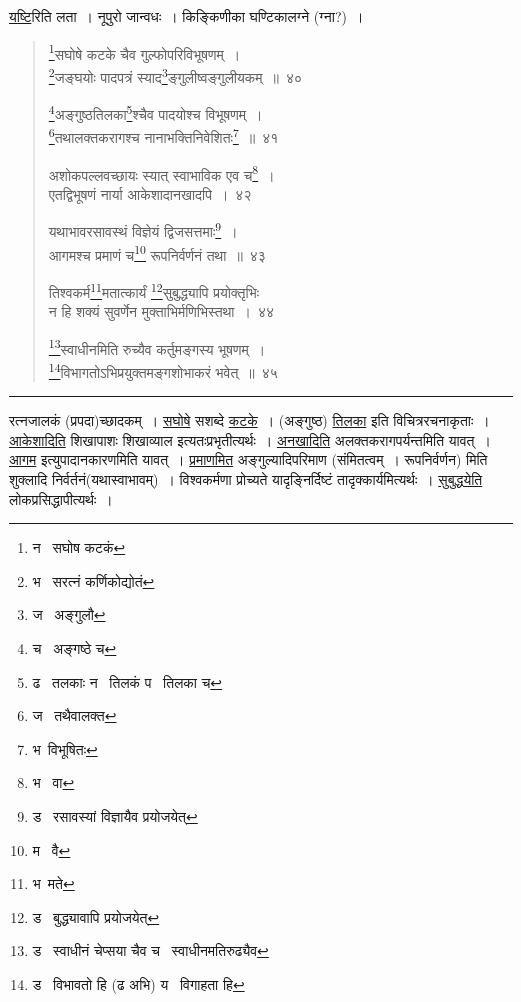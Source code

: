 \documentclass[11pt, openany]{book}
\begin{document}
\underline{यष्टि}रिति लता~। नूपुरो जान्वधः~। किङ्किणीका घण्टिकालग्ने (ग्ना?)~। 

\newpage

\begin{quote}
{\na \renewcommand{\thefootnote}{1}\footnote{न \textendash\ सघोष कटकं}सघोषे कटके चैव गुल्फोपरिविभूषणम्~।\\
\renewcommand{\thefootnote}{2}\footnote{भ \textendash\ सरत्नं कर्णिकोद्योतं}जङ्घयोः पादपत्रं स्याद\renewcommand{\thefootnote}{3}\footnote{ज \textendash\ अङ्गुलौ}ङ्गुलीष्वङ्गुलीयकम्~॥~४०

\renewcommand{\thefootnote}{4}\footnote{च \textendash\ अङ्गष्ठे च}अङ्गुष्ठतिलका\renewcommand{\thefootnote}{5}\footnote{ढ \textendash\ तलकाः न \textendash\ तिलकं प \textendash\ तिलका च}श्चैव पादयोश्च विभूषणम्~।\\
\renewcommand{\thefootnote}{6}\footnote{ज \textendash\ तथैवालक्त}तथालक्तकरागश्च नानाभक्तिनिवेशितः\renewcommand{\thefootnote}{7}\footnote{भ\textendash\ विभूषितः}~॥~४१

अशोकपल्लवच्छायः स्यात् स्वाभाविक एव च\renewcommand{\thefootnote}{8}\footnote{भ \textendash\ वा}~।\\
एतद्विभूषणं नार्या आकेशादानखादपि~।~४२

यथाभावरसावस्थं विज्ञेयं द्विजसत्तमाः\renewcommand{\thefootnote}{9}\footnote{ड \textendash\ रसावस्यां विज्ञायैव प्रयोजयेत्}~।\\
आगमश्च प्रमाणं च\renewcommand{\thefootnote}{10}\footnote{म \textendash\ वै} रूपनिर्वर्णनं तथा~॥~४३

तिश्वकर्म\renewcommand{\thefootnote}{11}\footnote{भ\textendash\ मते}मतात्कार्यं \renewcommand{\thefootnote}{12}\footnote{ड \textendash\ बुद्ध्यावापि प्रयोजयेत्}सुबुद्ध्यापि प्रयोक्तृभिः\\
न हि शक्यं सुवर्णेन मुक्ताभिर्मणिभिस्तथा~।~४४

\renewcommand{\thefootnote}{13}\footnote{ड \textendash\ स्वाधीनं चेप्सया चैव च \textendash\ स्वाधीनमतिरुढ्यैव}स्वाधीनमिति रुच्यैव कर्तुमङ्गस्य भूषणम्~।\\
\renewcommand{\thefootnote}{14}\footnote{ड \textendash\ विभावतो हि (ढ अभि) य \textendash\ विगाहता हि}विभागतोऽभिप्रयुक्तमङ्गशोभाकरं भवेत्~॥~४५}
\end{quote}

\hrule

\vspace{2mm}
\noindent
रत्नजालकं (प्रपदा)च्छादकम्~। \underline{सघोषे} सशब्दे \underline{कटके}~। (अङ्गुष्ठ) \underline{तिलका} इति विचित्ररचनाकृताः~। \underline{आकेशादिति} शिखापाशः शिखाव्याल इत्यतःप्रभृतीत्यर्थः~। \underline{अनखादिति} अलक्तकरागपर्यन्तमिति यावत्~। \underline{आगम} इत्युपादानकारणमिति यावत्~। \underline{प्रमाणमित} अङ्गुल्यादिपरिमाण (संमितत्वम्~। रूपनिर्वर्णन) मिति शुक्लादि निर्वर्तनं(यथास्वाभावम्)~। विश्वकर्मणा प्रोच्यते यादृङ्निर्दिष्टं तादृक्कार्यमित्यर्थः~। \underline{सुबुद्धयेति} लोकप्रसिद्धापीत्यर्थः~। 
\end{document}
